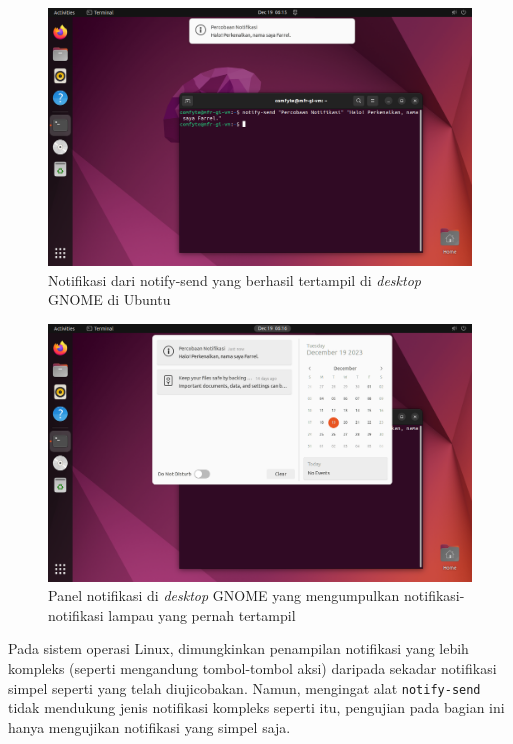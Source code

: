 \begin{figure}
    \centering
    \includegraphics[width=1\linewidth]{archives//contents-template-pak-prapto//chapter-4/Screenshot from 2023-12-19 06-15-10.png}
    \caption{Notifikasi dari notify-send yang berhasil tertampil di \textit{desktop} GNOME di Ubuntu}
    \label{ubuntu-notify-send-demo}
\end{figure}

\begin{figure}
    \centering
    \includegraphics[width=1\linewidth]{archives//contents-template-pak-prapto//chapter-4/Screenshot from 2023-12-19 06-16-29.png}
    \caption{Panel notifikasi di \textit{desktop} GNOME yang mengumpulkan notifikasi-notifikasi lampau yang pernah tertampil}
    \label{ubuntu-notification-panel}
\end{figure}

Pada sistem operasi Linux, dimungkinkan penampilan notifikasi yang lebih kompleks (seperti mengandung tombol-tombol aksi) daripada sekadar notifikasi simpel seperti yang telah diujicobakan. Namun, mengingat alat \verb|notify-send| tidak mendukung jenis notifikasi kompleks seperti itu, pengujian pada bagian ini hanya mengujikan notifikasi yang simpel saja.

